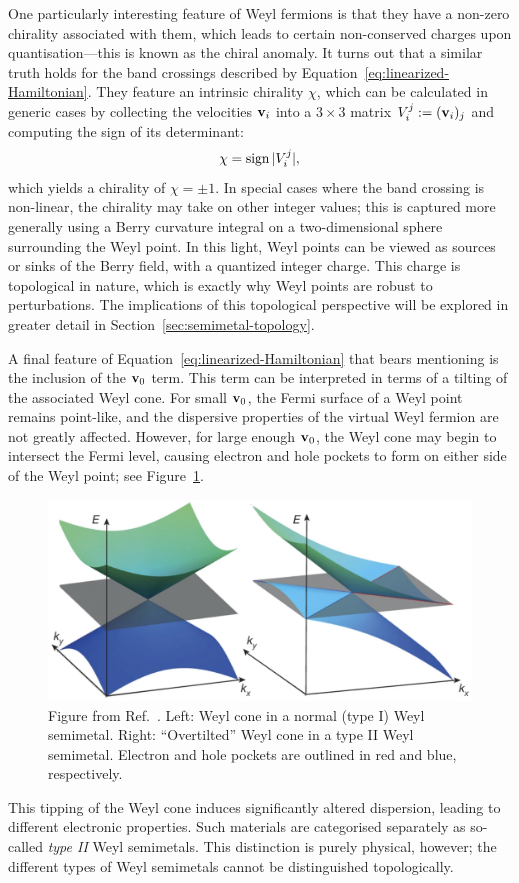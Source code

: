 One particularly interesting feature of Weyl fermions is that they have a non-zero chirality associated with them, which leads to certain non-conserved charges upon quantisation---this is known as the chiral anomaly. It turns out that a similar truth holds for the band crossings described by Equation~\eqref{eq:linearized-Hamiltonian}. They feature an intrinsic chirality $\chi$, which can be calculated in generic cases by collecting the velocities $\vb{v}_i$ into a $3\times 3$ matrix $V_i^j := (\vb{v}_i)_j$ and computing the sign of its determinant:
\begin{equation}\label{eq:determinant_chirality}
	\chi = \operatorname{sign}{|V_i^j|},
\end{equation} 
which yields a chirality of $\chi=\pm1$. In special cases where the band crossing is non-linear, the chirality may take on other integer values; this is captured more generally using a Berry curvature integral on a two-dimensional sphere surrounding the Weyl point. In this light, Weyl points can be viewed as sources or sinks of the Berry field, with a quantized integer charge. This charge is topological in nature, which is exactly why Weyl points are robust to perturbations. The implications of this topological perspective will be explored in greater detail in Section~\ref{sec:semimetal-topology}.

A final feature of Equation~\eqref{eq:linearized-Hamiltonian} that bears mentioning is the inclusion of the $\vb{v}_0$ term. This term can be interpreted in terms of a tilting of the associated Weyl cone. For small $\vb{v}_0$, the Fermi surface of a Weyl point remains point-like, and the dispersive properties of the virtual Weyl fermion are not greatly affected. However, for large enough $\vb{v}_0$, the Weyl cone may begin to intersect the Fermi level, causing electron and hole pockets to form on either side of the Weyl point; see Figure~\ref{fig:Weyl-cone-tilt}.
\begin{figure}[htb!]
	\centering
	\includegraphics[width=.7\linewidth]{Images/Weyl-cone-tilt}
	\caption{Figure from Ref.~\cite{Soluyanov_Type-II}. Left: Weyl cone in a normal (type I) Weyl semimetal. Right: ``Overtilted'' Weyl cone in a type II Weyl semimetal. Electron and hole pockets are outlined in red and blue, respectively.}
	\label{fig:Weyl-cone-tilt}
\end{figure} %
This tipping of the Weyl cone induces significantly altered dispersion, leading to different electronic properties. Such materials are categorised separately as so-called \emph{type II} Weyl semimetals. %
This distinction is purely physical, however; the different types of Weyl semimetals cannot be distinguished topologically.

